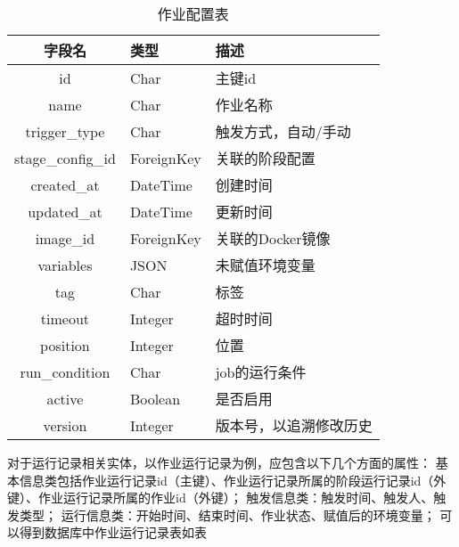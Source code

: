 \begin{table}[h]
  \centering
  \caption{作业配置表}
  \label{tab:作业配置表}
  \begin{tabular}{cll}
    \toprule
    字段名                  & 类型            & 描述                                       \\
    \midrule
    id                      & Char           & 主键id                                   \\
    name                    & Char           & 作业名称                                   \\
    trigger\_type           & Char           & 触发方式，自动/手动                        \\
    stage\_config\_id       & ForeignKey     & 关联的阶段配置                             \\
    created\_at             & DateTime       & 创建时间                                    \\
    updated\_at             & DateTime       & 更新时间                                    \\
    image\_id               & ForeignKey     & 关联的Docker镜像                            \\
    variables               & JSON           & 未赋值环境变量                              \\
    tag                     & Char           & 标签                                       \\
    timeout                 & Integer        & 超时时间                                    \\
    position                & Integer        & 位置                                        \\
    run\_condition          & Char           & job的运行条件                               \\
    active                  & Boolean        & 是否启用                                    \\
    version                 & Integer        & 版本号，以追溯修改历史                        \\
    \bottomrule
  \end{tabular}
\end{table}

对于运行记录相关实体，以作业运行记录为例，应包含以下几个方面的属性：
基本信息类包括作业运行记录id（主键）、作业运行记录所属的阶段运行记录id（外键）、作业运行记录所属的作业id（外键）；
触发信息类：触发时间、触发人、触发类型；
运行信息类：开始时间、结束时间、作业状态、赋值后的环境变量；
可以得到数据库中作业运行记录表如表~ 

